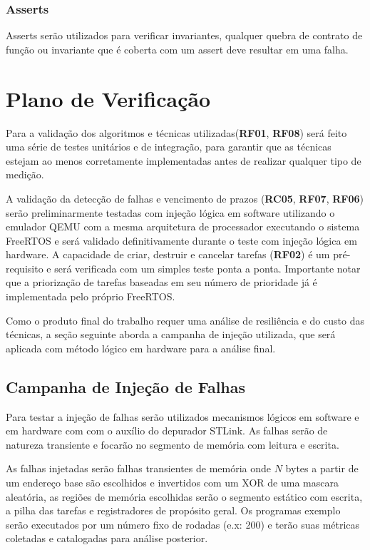 \subsubsection{Asserts}

Asserts serão utilizados para verificar invariantes, qualquer quebra de contrato de função ou invariante que é coberta com um assert deve resultar em uma falha.

\section{Plano de Verificação}

Para a validação dos algoritmos e técnicas utilizadas(\textbf{RF01}, \textbf{RF08}) será feito uma série de testes unitários e de integração, para garantir que as técnicas estejam ao menos corretamente implementadas antes de realizar qualquer tipo de medição.

A validação da detecção de falhas e vencimento de prazos (\textbf{RC05}, \textbf{RF07}, \textbf{RF06}) serão preliminarmente testadas com injeção lógica em software utilizando o emulador QEMU com a mesma arquitetura de processador executando o sistema FreeRTOS e será validado definitivamente durante o teste com injeção lógica em hardware. A capacidade de criar, destruir e cancelar tarefas (\textbf{RF02}) é um pré-requisito e será verificada com um simples teste ponta a ponta. Importante notar que a priorização de tarefas baseadas em seu número de prioridade já é implementada pelo próprio FreeRTOS.

Como o produto final do trabalho requer uma análise de resiliência e do custo das técnicas, a seção seguinte aborda a campanha de injeção utilizada, que será aplicada com método lógico em hardware para a análise final.

\subsection{Campanha de Injeção de Falhas} \label{subsec:campanhaInjecao}

Para testar a injeção de falhas serão utilizados mecanismos lógicos em software e em hardware com com o auxílio do depurador STLink. As falhas serão de natureza transiente e focarão no segmento de memória com leitura e escrita.

As falhas injetadas serão falhas transientes de memória onde $N$ bytes a partir de um endereço base são escolhidos e invertidos com um XOR de uma mascara aleatória, as regiões de memória escolhidas serão o segmento estático com escrita, a pilha das tarefas e registradores de propósito geral. Os programas exemplo serão executados por um número fixo de rodadas (e.x: 200) e terão suas métricas coletadas e  catalogadas para análise posterior.

